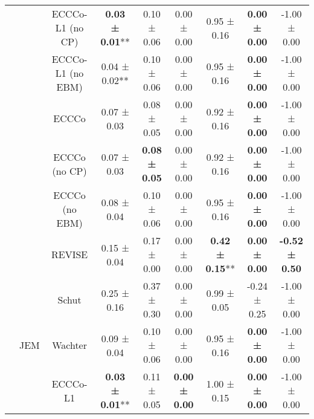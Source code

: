 \begin{longtable}[t]{ccccccccc}
 &  & ECCCo-L1 (no CP) & \textbf{0.03 ± 0.01}** & 0.10 ± 0.06\hphantom{*}\hphantom{*} & 0.00 ± 0.00\hphantom{*}\hphantom{*} & 0.95 ± 0.16\hphantom{*}\hphantom{*} & \textbf{0.00 ± 0.00}\hphantom{*}\hphantom{*} & -1.00 ± 0.00\hphantom{*}\hphantom{*}\\

 &  & ECCCo-L1 (no EBM) & 0.04 ± 0.02** & 0.10 ± 0.06\hphantom{*}\hphantom{*} & 0.00 ± 0.00\hphantom{*}\hphantom{*} & 0.95 ± 0.16\hphantom{*}\hphantom{*} & \textbf{0.00 ± 0.00}\hphantom{*}\hphantom{*} & -1.00 ± 0.00\hphantom{*}\hphantom{*}\\

 &  & ECCCo & 0.07 ± 0.03\hphantom{*}\hphantom{*} & 0.08 ± 0.05\hphantom{*}\hphantom{*} & 0.00 ± 0.00\hphantom{*}\hphantom{*} & 0.92 ± 0.16\hphantom{*}\hphantom{*} & \textbf{0.00 ± 0.00}\hphantom{*}\hphantom{*} & -1.00 ± 0.00\hphantom{*}\hphantom{*}\\

 &  & ECCCo (no CP) & 0.07 ± 0.03\hphantom{*}\hphantom{*} & \textbf{0.08 ± 0.05}\hphantom{*}\hphantom{*} & 0.00 ± 0.00\hphantom{*}\hphantom{*} & 0.92 ± 0.16\hphantom{*}\hphantom{*} & \textbf{0.00 ± 0.00}\hphantom{*}\hphantom{*} & -1.00 ± 0.00\hphantom{*}\hphantom{*}\\

 &  & ECCCo (no EBM) & 0.08 ± 0.04\hphantom{*}\hphantom{*} & 0.10 ± 0.06\hphantom{*}\hphantom{*} & 0.00 ± 0.00\hphantom{*}\hphantom{*} & 0.95 ± 0.16\hphantom{*}\hphantom{*} & \textbf{0.00 ± 0.00}\hphantom{*}\hphantom{*} & -1.00 ± 0.00\hphantom{*}\hphantom{*}\\

 &  & REVISE & 0.15 ± 0.04\hphantom{*}\hphantom{*} & 0.17 ± 0.00\hphantom{*}\hphantom{*} & 0.00 ± 0.00\hphantom{*}\hphantom{*} & \textbf{0.42 ± 0.15}** & \textbf{0.00 ± 0.00}\hphantom{*}\hphantom{*} & \textbf{-0.52 ± 0.50}\hphantom{*}\hphantom{*}\\

 &  & Schut & 0.25 ± 0.16\hphantom{*}\hphantom{*} & 0.37 ± 0.30\hphantom{*}\hphantom{*} & 0.00 ± 0.00\hphantom{*}\hphantom{*} & 0.99 ± 0.05\hphantom{*}\hphantom{*} & -0.24 ± 0.25\hphantom{*}\hphantom{*} & -1.00 ± 0.00\hphantom{*}\hphantom{*}\\

 & \multirow[t]{-9}{*}{\centering\arraybackslash JEM} & Wachter & 0.09 ± 0.04\hphantom{*}\hphantom{*} & 0.10 ± 0.06\hphantom{*}\hphantom{*} & 0.00 ± 0.00\hphantom{*}\hphantom{*} & 0.95 ± 0.16\hphantom{*}\hphantom{*} & \textbf{0.00 ± 0.00}\hphantom{*}\hphantom{*} & -1.00 ± 0.00\hphantom{*}\hphantom{*}\\
\cmidrule{2-9}
 &  & ECCCo-L1 & \textbf{0.03 ± 0.01}** & 0.11 ± 0.05\hphantom{*}\hphantom{*} & \textbf{0.00 ± 0.00}\hphantom{*}\hphantom{*} & 1.00 ± 0.15\hphantom{*}\hphantom{*} & \textbf{0.00 ± 0.00}\hphantom{*}\hphantom{*} & -1.00 ± 0.00\hphantom{*}\hphantom{*}\\


\end{longtable}
